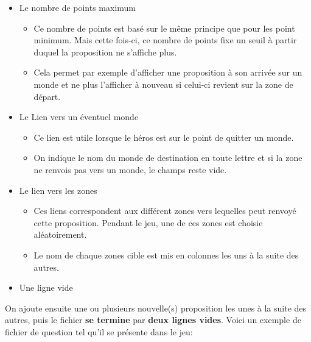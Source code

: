 \begin{itemize}
	
	\item Le nombre de points maximum
			
		  \begin{itemize}
		  	\item Ce nombre de points est basé sur le même principe que pour les point minimum. Mais cette fois-ci, ce 				  nombre de points fixe un seuil à partir duquel la proposition ne s'affiche plus.
		  	\item Cela permet par exemple d'afficher une proposition à son arrivée sur un monde et ne plus l'afficher
		  		  à nouveau si celui-ci revient sur la zone de départ. 
		  \end{itemize}	
		  
	\item Le Lien vers un éventuel monde
			
		  \begin{itemize}
		  	\item Ce lien est utile lorsque le héros est sur le point de quitter un monde.
		  	\item On indique le nom du monde de destination en toute lettre et si la zone ne renvois pas vers un 	  	                  monde, le champs reste vide. 
		  \end{itemize}	    
	
	\item Le lien vers les zones
			
		  \begin{itemize}
		  	\item Ces liens correspondent aux différent zones vers lequelles peut renvoyé cette proposition. Pendant 		              le jeu, une de ces zones est choisie aléatoirement.
		  	\item Le nom de chaque zones cible est mis en colonnes les uns à la suite des autres. 
		  \end{itemize}	  

	\item Une ligne vide
		
\end{itemize}  

On ajoute ensuite une ou plusieurs nouvelle(s) proposition les unes à la suite des autres, puis le fichier \textbf{se termine} par \textbf{deux lignes vides}.
\newpage
Voici un exemple de fichier de question tel qu'il se présente dans le jeu:

